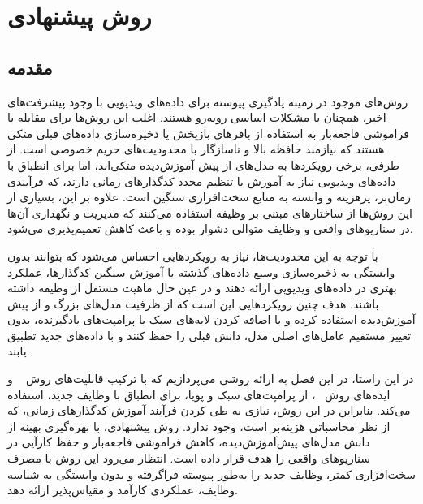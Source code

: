 \chapter{روش پیشنهادی}

\section{مقدمه}

روش‌های موجود در زمینه یادگیری پیوسته برای داده‌های ویدیویی با وجود پیشرفت‌های اخیر، همچنان با مشکلات اساسی روبه‌رو هستند. اغلب این روش‌ها برای مقابله با فراموشی فاجعه‌بار به استفاده از بافرهای بازپخش یا ذخیره‌سازی داده‌های قبلی متکی هستند که نیازمند حافظه بالا و ناسازگار با محدودیت‌های حریم خصوصی است. از طرفی، برخی رویکردها به مدل‌های از پیش آموزش‌دیده متکی‌اند، اما برای انطباق با داده‌های ویدیویی نیاز به آموزش یا تنظیم مجدد کدگذارهای زمانی دارند، که فرآیندی زمان‌بر، پرهزینه و وابسته به منابع سخت‌افزاری سنگین است. علاوه بر این، بسیاری از این روش‌ها از ساختارهای مبتنی بر وظیفه
استفاده می‌کنند که مدیریت و نگهداری آن‌ها در سناریوهای واقعی و وظایف متوالی دشوار بوده و باعث کاهش تعمیم‌پذیری می‌شود.

با توجه به این محدودیت‌ها، نیاز به رویکردهایی احساس می‌شود که بتوانند بدون وابستگی به ذخیره‌سازی وسیع داده‌های گذشته یا آموزش سنگین کدگذارها، عملکرد بهتری در داده‌های ویدیویی ارائه دهند و در عین حال ماهیت مستقل از وظیفه
 داشته باشند. هدف چنین رویکردهایی این است که از ظرفیت مدل‌های بزرگ و از پیش آموزش‌دیده استفاده کرده و با اضافه کردن لایه‌های سبک یا پرامپت‌های یادگیرنده، بدون تغییر مستقیم عامل‌های اصلی مدل، دانش قبلی را حفظ کنند و با داده‌های جدید تطبیق یابند.

در این راستا، در این فصل به ارائه روشی می‌پردازیم که با ترکیب قابلیت‌های روش
~\cite{open-vclip}
و ایده‌های روش
~\cite{l2p}، 
از پرامپت‌های سبک و پویا، برای انطباق با وظایف جدید، استفاده می‌کند. بنابراین در این روش، نیازی به طی کردن فرآیند آموزش کدگذارهای زمانی، که از نظر محاسباتی هزینه‌بر است، وجود ندارد.
روش پیشنهادی، با بهره‌گیری بهینه از دانش مدل‌های پیش‌آموزش‌دیده، کاهش فراموشی فاجعه‌بار و حفظ کارآیی در سناریوهای واقعی را هدف قرار داده است. انتظار می‌رود این روش با مصرف سخت‌افزاری کمتر، وظایف جدید را به‌طور پیوسته فراگرفته و بدون وابستگی به شناسه وظایف، عملکردی کارآمد و مقیاس‌پذیر ارائه دهد.

